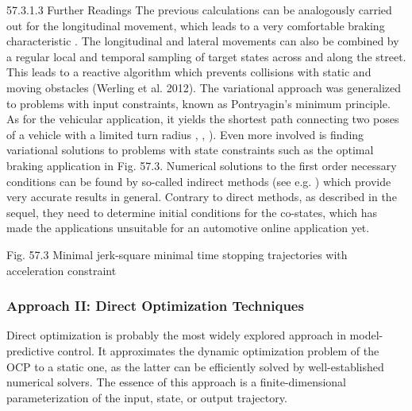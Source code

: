 57.3.1.3	Further Readings
The previous calculations can be analogously carried out for the longitudinal movement, which leads to a very comfortable braking characteristic  \cite{werling2014riccati}. The longitudinal and lateral movements can also be combined by a regular local and temporal sampling of target states across and along the street. This leads to a reactive algorithm which prevents collisions with static and moving obstacles (Werling et al. 2012).
The variational approach was generalized to problems with input constraints, known as Pontryagin's minimum principle. As for the vehicular application, it yields the shortest path connecting two poses of 
a vehicle with a limited turn radius \cite{dubins1957cml}, \cite{reeds1990optimal}, \cite{boissonnat1994note}). Even more involved is finding variational solutions to problems with state constraints such as the optimal braking application in Fig. 57.3.
Numerical solutions to the first order necessary conditions can be found by so-called indirect methods (see e.g. \cite{Graichen2012}) which provide very accurate results in general. Contrary to direct methods, as described in the sequel, they need to determine initial conditions for the co-states, which has made the applications unsuitable for an automotive online application yet.

Fig. 57.3 Minimal jerk-square minimal time stopping trajectories with acceleration constraint 

\subsubsection{Approach II: Direct Optimization Techniques}
Direct optimization is probably the most widely explored approach in model-predictive control. It approximates the dynamic optimization problem of the OCP to a static one, as the latter can be efficiently solved by well-established numerical solvers. The essence of this approach is a finite-dimensional parameterization of the input, state, or output trajectory.





